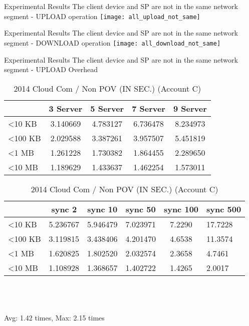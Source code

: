 \begin{frame}{Experimental Results}
{The client device and SP are \alert{not} in the same network segment - UPLOAD operation}
	\texttt{[image: all\_upload\_not\_same]}
\end{frame}

\begin{frame}{Experimental Results}
{The client device and SP are \alert{not} in the same network segment - DOWNLOAD operation}
	\texttt{[image: all\_download\_not\_same]}
\end{frame}

\begin{frame}{Experimental Results}
{The client device and SP are \alert{not} in the same network segment - UPLOAD Overhead}
	\scriptsize
    \begin{table}[]
    \centering
    \caption{My Method / Non POV (IN SEC.) (Account C)}
    \begin{tabular}{lcccc}
                         & 3 Server & 5 Server & 7 Server & 9 Server \\ \hline
        \textless 10 KB  & 3.140669 & 4.783127 & 6.736478 & 8.234973 \\ \hline
        \textless 100 KB & 2.029588 & 3.387261 & 3.957507 & 5.451819 \\ \hline
        \textless 1 MB   & 1.261228 & 1.730382 & 1.864455 & 2.289650 \\ \hline
        \textless 10 MB  & 1.189629 & 1.433637 & 1.462254 & 1.573011 \\ \hline
    \end{tabular}
    \caption{2014 Cloud Com / Non POV (IN SEC.) (Account C)}
    \begin{tabular}{lccccl}
                         & sync 2   & sync 10  & sync 50  & sync 100 & sync 500 \\ \hline
        \textless 10 KB  & 5.236767 & 5.946479 & 7.023971 & 7.2290   & 17.7228  \\ \hline
        \textless 100 KB & 3.119815 & 3.438406 & 4.201470 & 4.6538   & 11.3574  \\ \hline
        \textless 1 MB   & 1.620825 & 1.802520 & 2.032574 & 2.3658   & 4.7461   \\ \hline
        \textless 10 MB  & 1.108928 & 1.368657 & 1.402722 & 1.4265   & 2.0017   \\ \hline
    \end{tabular}
    ~\\
    ~\\
    ~\\
    \alert{Avg: 1.42 times, Max: 2.15 times}
    \end{table}
\end{frame}

